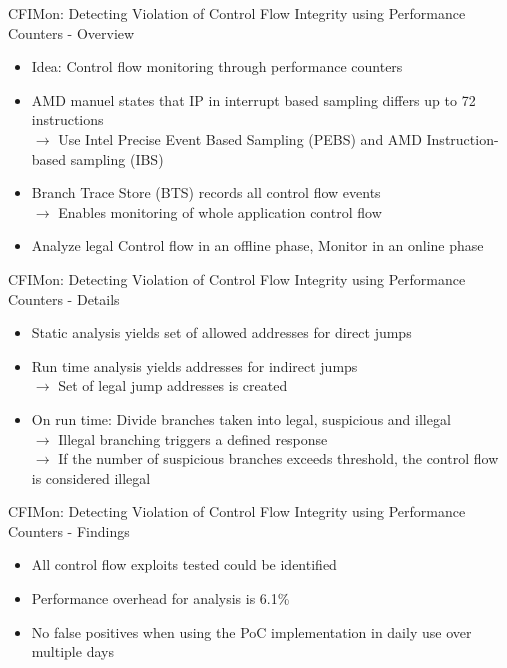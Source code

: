 \documentclass[aspectratio=169]{beamer}
\begin{document}
\begin{frame}{CFIMon: Detecting Violation of Control Flow Integrity using Performance Counters - Overview}
    \begin{itemize}
        \item Idea: Control flow monitoring through performance counters
        \item AMD manuel states that IP in interrupt based sampling differs up to 72 instructions
              \\ $\rightarrow$ Use Intel Precise Event Based Sampling (PEBS) and AMD Instruction-based sampling (IBS)
        \item Branch Trace Store (BTS) records all control flow events
              \\ $\rightarrow$ Enables monitoring of whole application control flow
        \item Analyze legal Control flow in an offline phase, Monitor in an online phase
    \end{itemize}
\end{frame}
\begin{frame}{CFIMon: Detecting Violation of Control Flow Integrity using Performance Counters - Details}
    \begin{itemize}
        \item Static analysis yields set of allowed addresses for direct jumps
        \item Run time analysis yields addresses for indirect jumps
              \\ $\rightarrow$ Set of legal jump addresses is created
        \item On run time: Divide branches taken into legal, suspicious and illegal
              \\ $\rightarrow$ Illegal branching triggers a defined response
              \\ $\rightarrow$ If the number of suspicious branches exceeds threshold, the control flow is considered illegal
    \end{itemize}
\end{frame}
\begin{frame}{CFIMon: Detecting Violation of Control Flow Integrity using Performance Counters - Findings}
    \begin{itemize}
        \item All control flow exploits tested could be identified
        \item Performance overhead for analysis is 6.1\%
        \item No false positives when using the PoC implementation in daily use over multiple days
    \end{itemize}
\end{frame}
\end{document}
